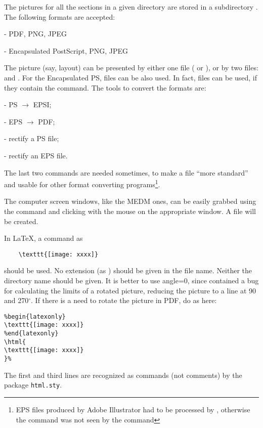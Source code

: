 \documentclass[12pt,letterpaper]{article}
\begin{document}
  The pictures for all the sections in a given directory are stored
  in a subdirectory . The following formats are accepted:
  
  \begin{list}{}{\setlength{\itemsep}{-0.15cm}}
    \item {} - PDF, PNG, JPEG
    \item {} - Encapsulated PostScript, PNG, JPEG 
  \end{list}
  The picture (say, layout) can be presented by either one
  file ( or ), or by two
  files:  and .
  For the Encapsulated PS,  files can be also used.
  In fact,  files can be used, if they contain
  the  command. The tools to convert
  the formats are:
  \begin{list}{}{\setlength{\itemsep}{-0.15cm}}
    \item {} - PS $\rightarrow$ EPSI;
    \item {} - EPS $\rightarrow$ PDF;
    \item {} - rectify a PS file;
    \item {} - rectify an EPS file.
  \end{list}

  The last two commands are needed sometimes, to
  make a file ``more standard'' and usable for other
  format converting programs\footnote{EPS files produced by
  Adobe Illustrator had to be processed by ,
  otherwise the  command was not seen by
  the  command}.
  
  The computer screen windows, like the MEDM ones, can be easily
  grabbed using the command  and clicking
  with the mouse on the appropriate window. A file 
  will be created.

  In \LaTeX{}, a command as
  {\color{blue}
  \begin{verbatim}
    \texttt{[image: xxxx]}
  \end{verbatim}
  } \noindent
  should be used. No extension (as ) should be
  given in the file name. Neither the directory name
   should be given.
  It is better to use angle=0, since
    contained a bug for calculating
    the limits of a rotated picture, reducing the picture to a line
    at 90 and 270$^{\circ}$. If there is a need to rotate
    the picture in PDF, do as here:
  {\color{blue}
  \begin{verbatim}
%begin{latexonly}
\texttt{[image: xxxx]}
%end{latexonly}
\html{
\texttt{[image: xxxx]}
}%
  \end{verbatim}%
  }\noindent%
  The first and third lines are recognized as commands (not comments)
  by the package {\color{blue}\verb|html.sty|}.
\end{document}
